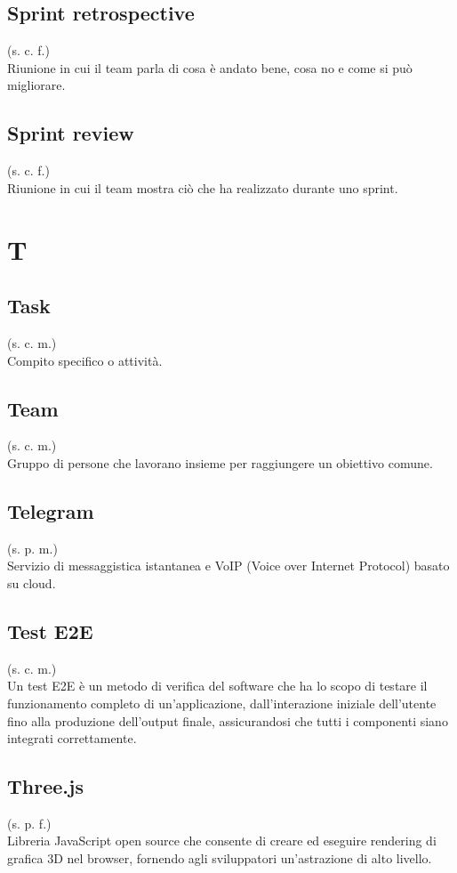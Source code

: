     \subsection{Sprint retrospective}
    \label{Sprint retrospective}
    (s. c. f.)\\
    Riunione in cui il team parla di cosa è andato bene, cosa no e come si può migliorare.
    \subsection{Sprint review}
    (s. c. f.)\\ 
    Riunione in cui il team mostra ciò che ha realizzato durante uno sprint.
\pagebreak
\section{T}
    \subsection{Task}
    (s. c. m.)\\
    Compito specifico o attività.
    \subsection{Team}
    (s. c. m.)\\
    \label{Team}
    Gruppo di persone che lavorano insieme per raggiungere un obiettivo comune.
    \subsection{Telegram}
    (s. p. m.)\\
    Servizio di messaggistica istantanea e VoIP (Voice over Internet Protocol)
    basato su cloud.
    \subsection{Test E2E}
    (s. c. m.)\\
    Un test E2E è un metodo di verifica del software che ha lo scopo di testare il funzionamento completo di un'applicazione, 
    dall'interazione iniziale dell'utente fino alla produzione dell'output finale, assicurandosi che tutti i componenti siano integrati correttamente.
    \subsection{Three.js}
    (s. p. f.)\\
    Libreria JavaScript open source che consente di creare ed eseguire rendering 
    di grafica 3D nel browser, fornendo agli sviluppatori un'astrazione di alto livello.
\pagebreak

